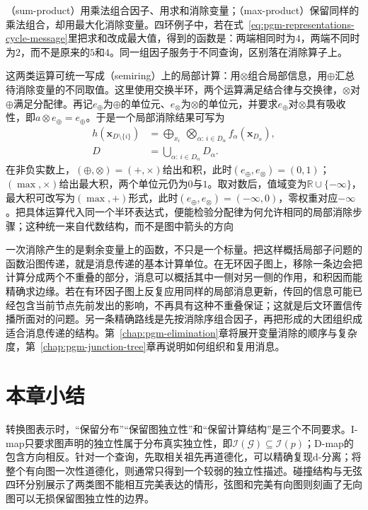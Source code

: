 （sum-product）用乘法组合因子、用求和消除变量；（max-product）保留同样的乘法组合，却用最大化消除变量。四环例子中，若在式~\eqref{eq:pgm-representations-cycle-message}里把求和改成最大值，得到的函数是：两端相同时为$4$，两端不同时为$2$，而不是原来的$5$和$4$。同一组因子服务于不同查询，区别落在消除算子上。

这两类运算可统一写成（semiring）上的局部计算：用$\otimes$组合局部信息，用$\oplus$汇总待消除变量的不同取值。这里使用交换半环，两个运算满足结合律与交换律，$\otimes$对$\oplus$满足分配律。再记$e_\oplus$为$\oplus$的单位元、$e_\otimes$为$\otimes$的单位元，并要求$e_\oplus$对$\otimes$具有吸收性，即$a\otimes e_\oplus=e_\oplus$。于是一个局部消除结果可写为
\begin{equation}
  \begin{aligned}
    h(\bm{x}_{D\setminus\{i\}})
    &=
    \bigoplus_{x_i}
    \ \bigotimes_{\alpha:\,i\in D_\alpha}
    f_\alpha(\bm{x}_{D_\alpha}),\\
    D&=\bigcup_{\alpha:\,i\in D_\alpha}D_\alpha.
  \end{aligned}
  \label{eq:pgm-representations-semiring-elimination}
\end{equation}
在非负实数上，$(\oplus,\otimes)=(+,\times)$给出和积，此时$(e_\oplus,e_\otimes)=(0,1)$；$(\max,\times)$给出最大积，两个单位元仍为$0$与$1$。取对数后，值域变为$\mathbb{R}\cup\{-\infty\}$，最大积可改写为$(\max,+)$形式，此时$(e_\oplus,e_\otimes)=(-\infty,0)$，零权重对应$-\infty$。把具体运算代入同一个半环表达式，便能检验分配律为何允许相同的局部消除步骤；这种统一来自代数结构，而不是图中箭头的方向

一次消除产生的是剩余变量上的函数，不只是一个标量。把这样概括局部子问题的函数沿图传递，就是消息传递的基本计算单位。在无环因子图上，移除一条边会把计算分成两个不重叠的部分，消息可以概括其中一侧对另一侧的作用，和积因而能精确求边缘。若在有环因子图上反复应用同样的局部消息更新，传回的信息可能已经包含当前节点先前发出的影响，不再具有这种不重叠保证；这就是后文环置信传播所面对的问题。另一条精确路线是先按消除序组合因子，再把形成的大团组织成适合消息传递的结构。第~\ref{chap:pgm-elimination}章将展开变量消除的顺序与复杂度，第~\ref{chap:pgm-junction-tree}章再说明如何组织和复用消息。

\section{本章小结}
\label{sec:pgm-representations-summary}

转换图表示时，“保留分布”“保留图独立性”和“保留计算结构”是三个不同要求。I-map只要求图声明的独立性属于分布真实独立性，即$\mathcal{I}(\mathcal{G})\subseteq\mathcal{I}(p)$；D-map的包含方向相反。针对一个查询，先取相关祖先再道德化，可以精确复现d-分离；将整个有向图一次性道德化，则通常只得到一个较弱的独立性描述。碰撞结构与无弦四环分别展示了两类图不能相互完美表达的情形，弦图和完美有向图则刻画了无向图可以无损保留图独立性的边界。

